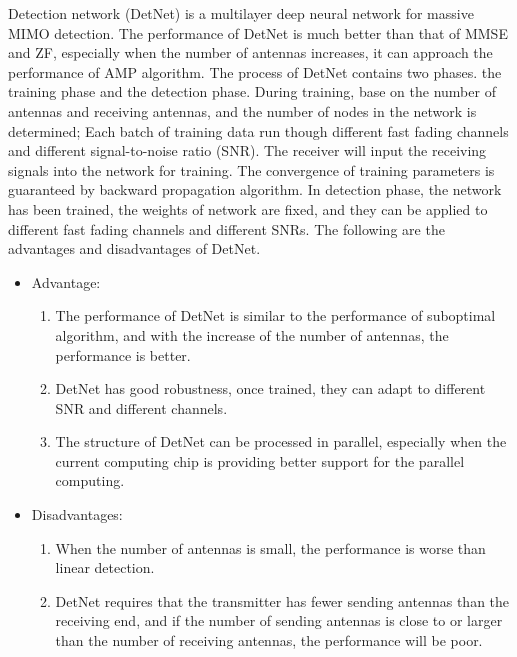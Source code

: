 \documentclass[conference]{IEEEtran}
\begin{document}
Detection network (DetNet)\cite{DetNet} is a multilayer deep neural network for massive MIMO detection. The performance of DetNet is much better than that of MMSE and ZF, especially when the number of antennas increases, it can approach the performance of AMP algorithm. The process of DetNet contains two phases. the training phase and the detection phase. During training, base on the number of antennas and receiving antennas, and the number of nodes in the network is determined; Each batch of training data run though different fast fading channels and different signal-to-noise ratio (SNR). The receiver will input the receiving signals into the network for training. The convergence of training parameters is guaranteed by backward propagation algorithm. In detection phase, the network has been trained, the weights of network are fixed, and they can be applied to different fast fading channels and different SNRs. The following are the advantages and disadvantages of DetNet.
\begin{itemize}
\item Advantage:
    \begin{enumerate}
        \item  The performance of DetNet is similar to the performance of suboptimal algorithm, and with the increase of the number of antennas, the performance is better.
        \item  DetNet has good robustness, once trained, they can adapt to different SNR and different channels.
        \item  The structure of DetNet can be processed in parallel, especially when the current computing chip is providing better support for the parallel computing.
    \end{enumerate}
\item Disadvantages:
    \begin{enumerate}
        \item  When the number of antennas is small, the performance is worse than linear detection.
        \item  DetNet requires that the transmitter has fewer sending antennas than the receiving end, and if the number of sending antennas is close to or larger than the number of receiving antennas, the performance will be poor.
    \end{enumerate}
\end{itemize}

\end{document}
